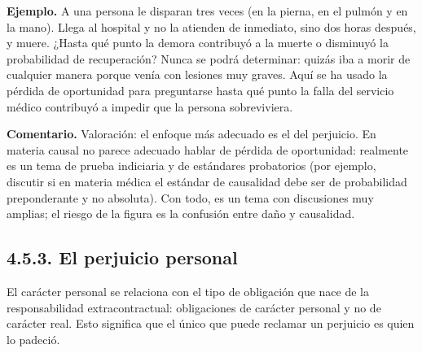 \begin{ejemplo}
\textcolor[HTML]{4F6228}{\textbf{Ejemplo. }}A una persona le disparan tres veces (en la pierna, en el pulmón y en la mano). Llega al hospital y no la atienden de inmediato, sino dos horas después, y muere. ¿Hasta qué punto la demora contribuyó a la muerte o disminuyó la probabilidad de recuperación? Nunca se podrá determinar: quizás iba a morir de cualquier manera porque venía con lesiones muy graves. Aquí se ha usado la pérdida de oportunidad para preguntarse hasta qué punto la falla del servicio médico contribuyó a impedir que la persona sobreviviera.
\end{ejemplo}
\begin{comentario}
\textcolor[HTML]{8A6D3B}{\textbf{Comentario. }}Valoración: el enfoque más adecuado es el del perjuicio. En materia causal no parece adecuado hablar de pérdida de oportunidad: realmente es un tema de prueba indiciaria y de estándares probatorios (por ejemplo, discutir si en materia médica el estándar de causalidad debe ser de probabilidad preponderante y no absoluta). Con todo, es un tema con discusiones muy amplias; el riesgo de la figura es la confusión entre daño y causalidad.
\end{comentario}
\subsection{4.5.3. El perjuicio personal}
El carácter personal se relaciona con el tipo de obligación que nace de la responsabilidad extracontractual: obligaciones de carácter personal y no de carácter real. Esto significa que el único que puede reclamar un perjuicio es quien lo padeció.

